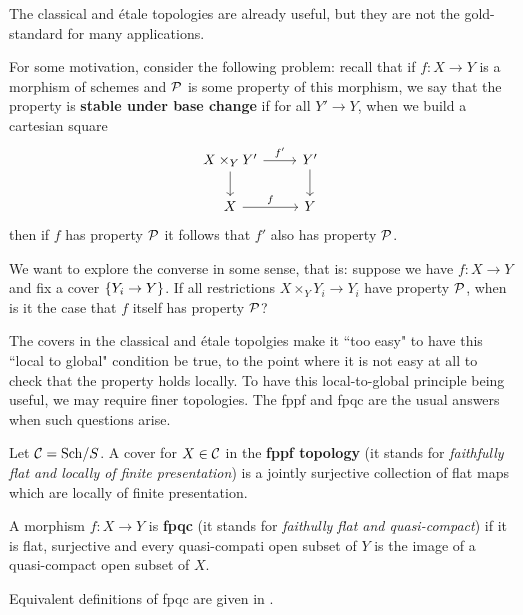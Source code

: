 The classical and \'etale topologies are already useful, but they are not the gold-standard for many applications.

For some motivation, consider the following problem: recall that if $f:X\to Y$ is a morphism of schemes and $\mathcal{P}$ is some property of this morphism, we say that the property is \textbf{stable under base change} if for all $Y'\to Y$, when we build a cartesian square
\[\begin{tikzcd}
	{X\times_YY'} & {Y'} \\
	X & Y
	\arrow["{f'}", from=1-1, to=1-2]
	\arrow[from=1-1, to=2-1]
	\arrow[from=1-2, to=2-2]
	\arrow["f", from=2-1, to=2-2]
\end{tikzcd}\]
then if $f$ has property $\mathcal{P}$ it follows that $f'$ also has property $\mathcal{P}$.

We want to explore the converse in some sense, that is: suppose we have $f:X\to Y$ and fix a cover $\left\{{Y_i\to Y}\right\}$. If all restrictions $X\times_YY_i\to Y_i$ have property $\mathcal{P}$, when is it the case that $f$ itself has property $\mathcal{P}$?


The covers in the classical and \'etale topolgies make it ``too easy" to have this ``local to global" condition be true, to the point where it is not easy at all to check that the property holds locally. To have this local-to-global principle being useful, we may require finer topologies. The fppf and fpqc are the usual answers when such questions arise.

\begin{definition}
Let $\mathcal{C}=\mathrm{Sch}/S$. A cover for $X\in \mathcal{C}$ in the \textbf{fppf topology} (it stands for \textit{faithfully flat and locally of finite presentation}) is a jointly surjective collection of flat maps which are locally of finite presentation. 
\end{definition}

\begin{definition}
A morphism $f:X\to Y$ is \textbf{fpqc} (it stands for \textit{faithully flat and quasi-compact}) if it is flat, surjective and every quasi-compati open subset of $Y$ is the image of a quasi-compact open subset of $X$.
\end{definition}

\begin{remark}
Equivalent definitions of fpqc are given in \cite{vistoli2007notesgrothendiecktopologiesfibered}.
\end{remark}


